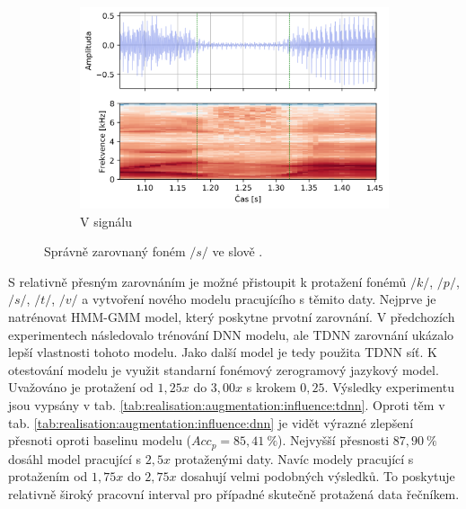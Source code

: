 \begin{figure}[htpb]
\begin{subfigure}[b]{0.65\textwidth}
    \includegraphics[width=\textwidth]{./ch6-realisation/img/energy_spec_word-segment-2.png}
    \caption{V signálu}
    \label{fig:realisation:augmentation:alignemnt:correct:audio}
  \end{subfigure}
  \caption{Správně zarovnaný foném $/s/$ ve slově .}
  \label{fig:realisation:augmentation:alignemnt:correct}
\end{figure}

S relativně přesným zarovnáním je možné přistoupit k protažení fonémů $/k/$, $/p/$, $/s/$, $/t/$, $/v/$ a vytvoření nového modelu pracujícího s těmito daty. Nejprve je natrénovat HMM-GMM model, který poskytne prvotní zarovnání. V předchozích experimentech následovalo trénování DNN modelu, ale TDNN zarovnání ukázalo lepší vlastnosti tohoto modelu. Jako další model je tedy použita TDNN síť. K otestování modelu je využit standarní fonémový zerogramový jazykový model. Uvažováno je protažení od $1,25x$ do $3,00x$ s krokem $0,25$. Výsledky experimentu jsou vypsány v tab. \ref{tab:realisation:augmentation:influence:tdnn}. Oproti těm v tab. \ref{tab:realisation:augmentation:influence:dnn} je vidět výrazné zlepšení přesnoti  oproti baselinu modelu ($Acc_{p} = 85,41\ \%$). Nejvyšší přesnosti $87,90\ \%$ dosáhl model pracující s $2,5x$ protaženými daty. Navíc modely pracující s protažením od $1,75x$ do $2,75x$ dosahují velmi podobných výsledků. To poskytuje relativně široký pracovní interval pro případné skutečně protažená data řečníkem.

